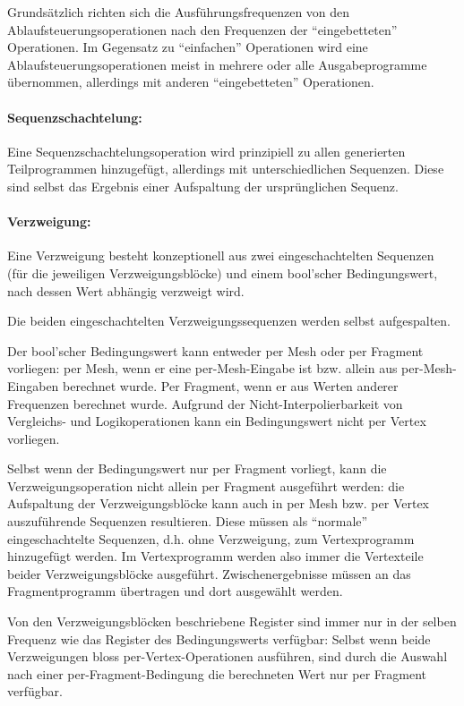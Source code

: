 \documentclass[twoside,a4paper,fleqn,12pt]{book}
\begin{document}
Grundsätzlich richten sich die Ausführungsfrequenzen von den Ablaufsteuerungsoperationen nach den Frequenzen der 
"`eingebetteten"' Operationen. Im Gegensatz zu "`einfachen"' Operationen wird eine Ablaufsteuerungsoperationen meist
in mehrere oder alle Ausgabeprogramme übernommen, allerdings mit anderen "`eingebetteten"' Operationen.

\paragraph{Sequenzschachtelung:} Eine Sequenzschachtelungsoperation wird prinzipiell zu allen generierten Teilprogrammen hinzugefügt,
allerdings mit unterschiedlichen Sequenzen. Diese sind selbst das Ergebnis einer Aufspaltung der ursprünglichen Sequenz.

\paragraph{Verzweigung:} Eine Verzweigung besteht konzeptionell aus zwei eingeschachtelten Sequenzen (für die jeweiligen Verzweigungsblöcke)
und einem bool'scher Bedingungswert, nach dessen Wert abhängig verzweigt wird.

Die beiden eingeschachtelten Verzweigungssequenzen werden selbst aufgespalten.

Der bool'scher Bedingungswert kann entweder per Mesh oder per Fragment vorliegen: per Mesh, wenn er eine per-Mesh-Eingabe ist bzw. allein aus
per-Mesh-Eingaben berechnet wurde. Per Fragment, wenn er aus Werten anderer Frequenzen berechnet wurde.
Aufgrund der Nicht-Interpolierbarkeit von Vergleichs- und Logikoperationen kann ein Bedingungswert nicht per Vertex vorliegen.

Selbst wenn der Bedingungswert nur per Fragment vorliegt, kann die Verzweigungsoperation nicht allein per Fragment ausgeführt werden:
die Aufspaltung der Verzweigungsblöcke kann auch in per Mesh bzw. per Vertex auszuführende Sequenzen resultieren. Diese müssen als "`normale"'
eingeschachtelte Sequenzen, d.h. ohne Verzweigung, zum Vertexprogramm hinzugefügt werden. Im Vertexprogramm werden also immer
die Vertexteile beider Verzweigungsblöcke ausgeführt. Zwischenergebnisse müssen an das Fragmentprogramm übertragen und dort ausgewählt werden.

Von den Verzweigungsblöcken beschriebene Register sind immer nur in der selben Frequenz wie das Register des Bedingungswerts verfügbar:
Selbst wenn beide Verzweigungen bloss per-Vertex-Operationen ausführen, sind durch die Auswahl nach einer per-Fragment-Bedingung
die berechneten Wert nur per Fragment verfügbar.
\end{document}
